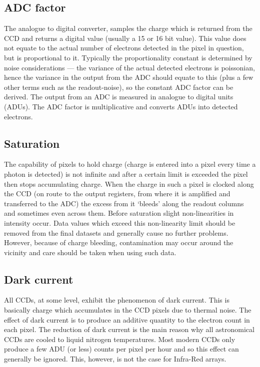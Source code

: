 \documentclass[twoside,11pt]{article}
\newcommand{\xlabel}[1]{}
\renewcommand{\_}{\texttt{\symbol{95}}}
\begin{document}
\subsection{ADC factor\xlabel{CCDglosADCfactor}}
The analogue to digital converter, samples the charge which is returned from
the CCD and returns a digital value (usually a 15 or 16 bit value). This value
does not equate to the actual number of electrons detected in the pixel in
question, but is proportional to it. Typically the proportionality constant is
determined by noise considerations --- the variance of the actual detected
electrons is poissonian, hence the variance in the output from the ADC should
equate to this (plus a few other terms such as the readout-noise), so the
constant ADC factor can be derived. The output from an ADC is measured in
analogue to digital units (ADUs). The ADC factor is multiplicative and converts
ADUs into detected electrons.

\subsection{Saturation\xlabel{CCDglossaturation}}
The capability of pixels to hold charge (charge is entered into a pixel
every time a photon is detected) is not infinite and after a certain
limit is exceeded the pixel then stops accumulating charge. When the
charge in such a pixel is clocked along the CCD (on route to the output
registers, from where it is amplified and transferred to the ADC) the
excess from it `bleeds' along the readout columns and sometimes even
across them. Before saturation slight non-linearities in
intensity occur. Data values which exceed this non-linearity limit
should be removed from the final datasets and generally cause no further
problems. However, because of charge bleeding, contamination may occur
around the vicinity and care should be taken when using such data.

\subsection{Dark current\xlabel{CCDglosdarkcurrent}}
All CCDs, at some level, exhibit the phenomenon of dark current. This is
basically charge which accumulates in the CCD pixels due to thermal
noise. The effect of dark current is to produce an additive quantity to
the electron count in each pixel. The reduction of dark current is the
main reason why all astronomical CCDs are cooled to liquid nitrogen
temperatures. Most modern CCDs only produce a few ADU (or less) counts
per pixel per hour and so this effect can generally be ignored. This,
however, is not the case for Infra-Red arrays.
\end{document}
